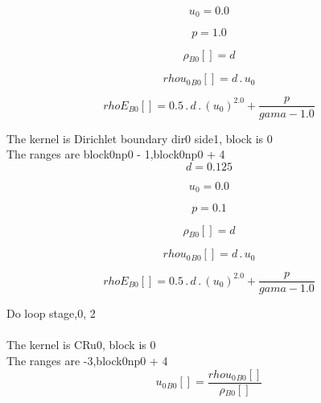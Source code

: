 \documentclass{article}
\begin{document}
\begin{dmath}u_{0} = 0.0\end{dmath}

\begin{dmath}p = 1.0\end{dmath}

\begin{dmath}{\rho{_{B0}}}[{}] = d\end{dmath}

\begin{dmath}{rhou_{0}{_{B0}}}[{}] = d \,.\, u_{0}\end{dmath}

\begin{dmath}{rhoE{_{B0}}}[{}] = 0.5 \,.\, d \,.\, \left(u_{0} \right)^{2.0} + \frac{p}{gama - 1.0}\end{dmath}

\noindent The kernel is Dirichlet boundary dir0 side1, block is 0\\\noindent The ranges are block0np0 - 1,block0np0 + 4\\\begin{dmath}d = 0.125\end{dmath}

\begin{dmath}u_{0} = 0.0\end{dmath}

\begin{dmath}p = 0.1\end{dmath}

\begin{dmath}{\rho{_{B0}}}[{}] = d\end{dmath}

\begin{dmath}{rhou_{0}{_{B0}}}[{}] = d \,.\, u_{0}\end{dmath}

\begin{dmath}{rhoE{_{B0}}}[{}] = 0.5 \,.\, d \,.\, \left(u_{0} \right)^{2.0} + \frac{p}{gama - 1.0}\end{dmath}

\noindent Do loop stage,0, 2\\
\\\noindent The kernel is CRu0, block is 0\\\noindent The ranges are -3,block0np0 + 4\\\begin{dmath}{u_{0}{_{B0}}}[{}] = \frac{{rhou_{0}{_{B0}}}[{}]}{{\rho{_{B0}}}[{}]}\end{dmath}
\end{document}
